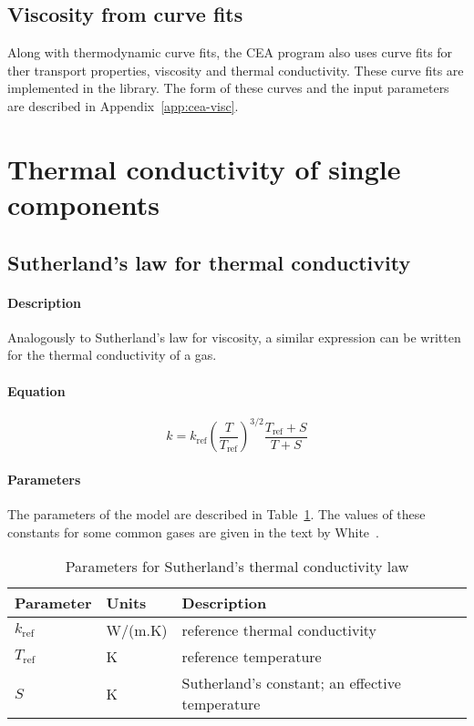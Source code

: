 \subsection{Viscosity from curve fits}
Along with thermodynamic curve fits, the CEA program also uses curve fits
for ther transport properties, viscosity and thermal conductivity.
These curve fits are implemented in the library.
The form of these curves and the input parameters are
described in Appendix~\ref{app:cea-visc}.

\section{Thermal conductivity of single components}

\subsection{Sutherland's law for thermal conductivity}

\paragraph{Description}
Analogously to Sutherland's law for viscosity, a similar expression can be
written for the thermal conductivity of a gas.

\paragraph{Equation}

\begin{equation}
k = k_{\text{ref}} \left(\frac{T}{T_{\text{ref}}}\right)^{3/2} \frac{T_{\text{ref}} + S}{T + S}
\end{equation}

\paragraph{Parameters}
The parameters of the model are described in Table~\ref{tab:Suth-k}.
The values of these constants for some common gases are given in the text by White~\cite{white_2006}.

\begin{table}[h]
\caption{Parameters for Sutherland's thermal conductivity law}
\label{tab:Suth-k}
\begin{tabular}{llp{10cm}}
\toprule
Parameter        & Units     & Description \\ \midrule
$k_{\text{ref}}$   & W/(m.K)   & reference thermal conductivity \\
$T_{\text{ref}}$   & K         & reference temperature  \\
$S$              & K         & Sutherland's constant; an effective temperature \\
\bottomrule
\end{tabular}
\end{table}

